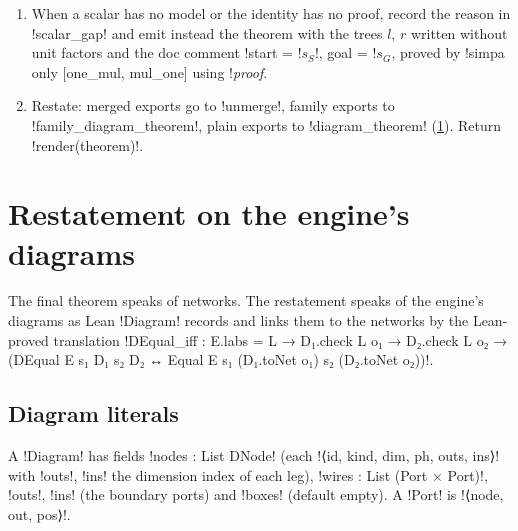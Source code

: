 {\begin{algorithm}[\py!finish!]
\begin{enumerate}
\begin{lstlisting}[style=grammar]
    Equal ENV (sS) Nstart (sG) Ngoal :=
  Equal.rescale PROOF
    NONZERO(l)
    (HST)
\end{lstlisting}
  where, when scalar definitions exist, the two last arguments are
  \code!(by (try simp only [!\textit{defs}\code!]); nzt)! and
  \code!(by simp only [!\textit{defs}\code!]; all_goals (!\textit{HST without "by "}\code!))!.
\item When a scalar has no model or the identity has no proof, record the reason in
  \py!scalar_gap! and emit instead the theorem with the trees $l$, $r$ written without unit
  factors and the doc comment \code!start = !$s_S$\code!, goal = !$s_G$, proved by
  \code!simpa only [one_mul, mul_one] using !\textit{proof}.
\item Restate: merged exports go to \py!unmerge!, family exports to
  \py!family_diagram_theorem!, plain exports to \py!diagram_theorem!
  (\cref{sec:lean-export-net-restate}). Return \py!render(theorem)!.
\end{enumerate}
\end{algorithm}

\section{Restatement on the engine's diagrams}\label{sec:lean-export-net-restate}

The final theorem speaks of networks. The restatement speaks of the engine's diagrams as Lean
\lean!Diagram! records and links them to the networks by the Lean-proved translation
\lean!DEqual_iff : E.labs = L → D₁.check L o₁ → D₂.check L o₂ → (DEqual E s₁ D₁ s₂ D₂ ↔ Equal E s₁ (D₁.toNet o₁) s₂ (D₂.toNet o₂))!.

\subsection{Diagram literals}\label{sec:lean-export-net-literal}

A \lean!Diagram! has fields \lean!nodes : List DNode! (each \lean!⟨id, kind, dim, ph, outs, ins⟩!
with \lean!outs!, \lean!ins! the dimension index of each leg), \lean!wires : List (Port × Port)!,
\lean!outs!, \lean!ins! (the boundary ports) and \lean!boxes! (default empty). A \lean!Port! is
\lean!⟨node, out, pos⟩!.

}
